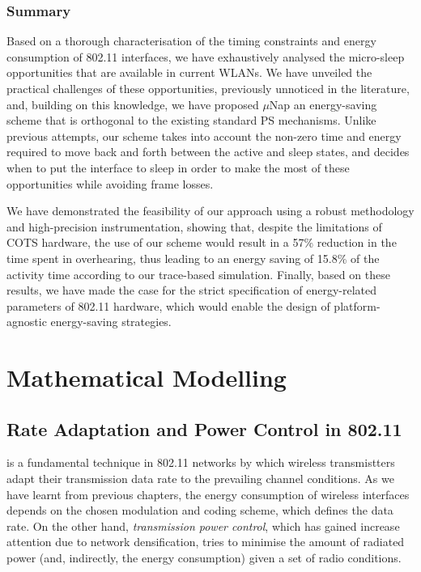 \documentclass[twoside,nohyper]{tufte-book}
\newcommand{\partseparator}{
  \noindent\leavevmode\leaders\hrule height 0.8ex depth \dimexpr0.4pt-0.8ex\hfill\kern0pt
  \newline~\vspace{-0.5\baselineskip}\newline}
\begin{document}
\hypertarget{summary-2}{%
\section{Summary}\label{summary-2}}

Based on a thorough characterisation of the timing constraints and energy consumption of 802.11 interfaces, we have exhaustively analysed the micro-sleep opportunities that are available in current WLANs. We have unveiled the practical challenges of these opportunities, previously unnoticed in the literature, and, building on this knowledge, we have proposed \(\mu\)Nap\cite[0pt]{contrib-05a,contrib-05b} an energy-saving scheme that is orthogonal to the existing standard PS mechanisms. Unlike previous attempts, our scheme takes into account the non-zero time and energy required to move back and forth between the active and sleep states, and decides when to put the interface to sleep in order to make the most of these opportunities while avoiding frame losses.

We have demonstrated the feasibility of our approach using a robust methodology and high-precision instrumentation, showing that, despite the limitations of COTS hardware, the use of our scheme would result in a 57\% reduction in the time spent in overhearing, thus leading to an energy saving of 15.8\% of the activity time according to our trace-based simulation. Finally, based on these results, we have made the case for the strict specification of energy-related parameters of 802.11 hardware, which would enable the design of platform-agnostic energy-saving strategies.

\addtocontents{toc}{\partseparator}

\hypertarget{part-mathematical-modelling}{%
\part{Mathematical Modelling}\label{part-mathematical-modelling}}

\hypertarget{ch:06}{%
\chapter{Rate Adaptation and Power Control in 802.11}\label{ch:06}}

 is a fundamental technique in 802.11 networks by which wireless transmistters adapt their transmission data rate to the prevailing channel conditions. As we have learnt from previous chapters, the energy consumption of wireless interfaces depends on the chosen modulation and coding scheme, which defines the data rate. On the other hand, \emph{transmission power control}, which has gained increase attention due to network densification, tries to minimise the amount of radiated power (and, indirectly, the energy consumption) given a set of radio conditions.
\end{document}
